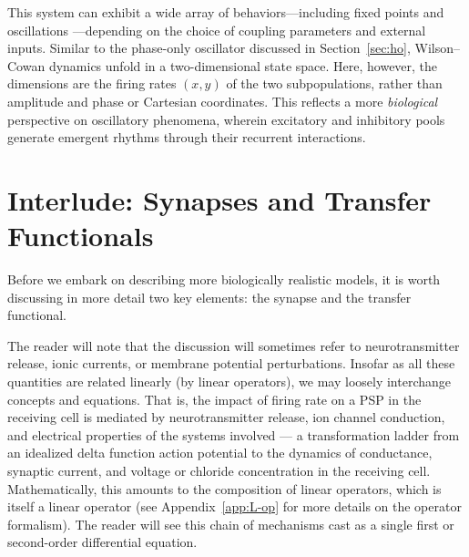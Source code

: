\documentclass[12pt]{article}
\numberwithin{equation}{section}
\begin{document}
This system can exhibit a wide array of behaviors---including fixed points and oscillations 
---depending on the choice of coupling parameters and external inputs.  
Similar to the phase-only oscillator discussed in Section~\ref{sec:ho}, 
Wilson--Cowan dynamics unfold in a two-dimensional state space. Here, however, the 
dimensions are the firing rates \((x, y)\) of the two subpopulations, rather than amplitude 
and phase or Cartesian coordinates. This reflects a more \emph{biological} perspective on 
oscillatory phenomena, wherein excitatory and inhibitory pools generate emergent rhythms 
through their recurrent interactions.








\section{Interlude: Synapses  and Transfer Functionals}
\label{sec:Interlude}
Before we embark on describing more biologically realistic models, it is worth discussing in more detail two key elements: the synapse and the transfer functional. 

\begin{tcolorbox}[colback=gray!6,colframe=gray!6,enlarge left by=0mm,
  boxrule=0pt, enhanced, sharp corners]
The reader will note that the discussion will sometimes refer to neurotransmitter release, ionic currents, or membrane potential perturbations. Insofar as all these quantities are related linearly (by linear operators), we may loosely interchange concepts and equations.
That is, the impact of firing rate on a PSP in the receiving cell is mediated by neurotransmitter release, ion channel conduction, and electrical properties of the systems involved ---
a transformation ladder from an idealized delta function
action potential to the dynamics of conductance, synaptic current, and voltage
or chloride concentration in the receiving cell. Mathematically, this amounts to the composition of linear operators, which is itself a linear operator (see Appendix~\ref{app:L-op} for more details on the operator formalism). 
The reader will see this chain of mechanisms cast as a single first or second-order differential equation. 
\end{tcolorbox}
\end{document}
